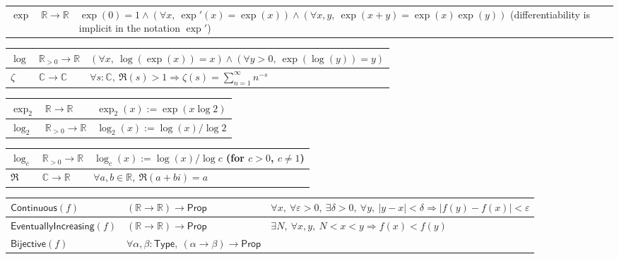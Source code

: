 \documentclass[11pt,reqno]{amsart}
\theoremstyle{blueplain}
\numberwithin{equation}{section}
\begin{document}
{\begin{tabular}{|m{5cm}|m{5cm}|m{8.3cm}|}
		$\exp$ & $\mathbb{R}\to\mathbb{R}$ &
		$\exp(0)=1\wedge(\forall x,\ \exp'(x)=\exp(x))
		\wedge(\forall x,y,\ \exp(x+y)=\exp(x)\exp(y))$
		(differentiability is implicit in the notation $\exp'$) \\ 
	\end{tabular}%
	\noindent \newline
	\noindent
	\begin{tabular}{|m{5cm}|m{5cm}|m{8.3cm}|}
		\hline
		$\log$ & $\mathbb{R}_{>0}\to\mathbb{R}$ &
		$(\forall x,\ \log(\exp(x))=x)\wedge(\forall y>0,\ \exp(\log(y))=y)$ \\ \hline
		$\zeta$ & $\mathbb{C}\to\mathbb{C}$ &
		$\forall s:\mathbb{C},\ \Re(s)>1\Rightarrow\zeta(s)=\sum_{n=1}^{\infty}n^{-s}$ \\ 
	\end{tabular}
	\noindent \newline
	\noindent
	\begin{tabular}{|m{5cm}|m{5cm}|m{8.3cm}|}
		\hline
		$\exp_2$ & $\mathbb{R}\to\mathbb{R}$ &
		$\exp_2(x):=\exp(x\log 2)$ \\ \hline
		$\log_2$ & $\mathbb{R}_{>0}\to\mathbb{R}$ &
		$\log_2(x):=\log(x)/\log 2$ \\ 
	\end{tabular}
	\noindent \newline
	\noindent
	\begin{tabular}{|m{5cm}|m{5cm}|m{8.3cm}|}
		\hline
		$\log_c$ & $\mathbb{R}_{>0}\to\mathbb{R}$ &
		$\log_c(x):=\log(x)/\log c$ \quad (for $c>0$, $c\neq 1$) \\ \hline
		$\Re$ & $\mathbb{C}\to\mathbb{R}$ &
		$\forall a,b\in\mathbb{R},\ \Re(a+bi)=a$ \\
	\end{tabular}%
	\noindent \newline
	\noindent
	\begin{tabular}{|m{5cm}|m{5cm}|m{8.3cm}|}
		\hline
		$\mathsf{Continuous}(f)$ & $(\mathbb{R}\to\mathbb{R})\to\mathsf{Prop}$ &
		$\forall x,\ \forall\varepsilon>0,\ \exists\delta>0,\ \forall y,\
		|y-x|<\delta\Rightarrow|f(y)-f(x)|<\varepsilon$ \\ \hline
		$\mathsf{EventuallyIncreasing}(f)$ & $(\mathbb{R}\to\mathbb{R})\to\mathsf{Prop}$ &
		$\exists N,\ \forall x,y,\ N<x<y\Rightarrow f(x)<f(y)$ \\ 
		\hline
		$\mathsf{Bijective}(f)$ & $\forall\alpha,\beta:\mathsf{Type},\ (\alpha\to\beta)\to\mathsf{Prop}$ &

\end{tabular}}
\end{document}
